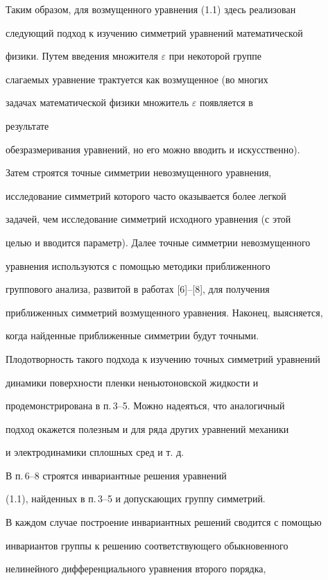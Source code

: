 Таким образом, для возмущенного уравнения (1.1) здесь реализован


следующий подход к изучению симметрий уравнений математической


физики. Путем введения множителя $\varepsilon$ при некоторой группе


слагаемых уравнение трактуется как возмущенное (во многих


задачах математической физики множитель $\varepsilon$ появляется в


результате


обезразмеривания уравнений, но его можно вводить и искусственно).


Затем строятся точные симметрии невозмущенного уравнения,


исследование симметрий которого часто оказывается более легкой


задачей, чем исследование симметрий исходного уравнения (с этой


целью и вводится параметр). Далее точные симметрии невозмущенного


уравнения используются с помощью методики приближенного


группового анализа, развитой в работах [6]--[8], для получения


приближенных симметрий возмущенного уравнения. Наконец, выясняется,


когда найденные приближенные симметрии будут точными.


Плодотворность такого подхода к изучению точных симметрий уравнений


динамики поверхности пленки неньютоновской жидкости и


продемонстрирована в п.\,3--5. Можно надеяться, что аналогичный


подход окажется полезным и для ряда других уравнений механики


и электродинамики сплошных сред и т. д.





В п.\,6--8 строятся инвариантные решения уравнений


(1.1), найденных в п.\,3--5 и допускающих группу симметрий.


В каждом случае построение инвариантных решений сводится с помощью


инвариантов группы к решению соответствующего обыкновенного


нелинейного дифференциального уравнения второго порядка,


